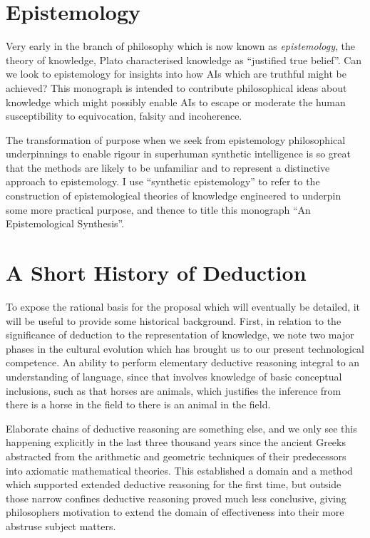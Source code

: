 \documentclass[10pt,titlepage]{book}
\begin{document}
\section{Epistemology}
  
Very early in the branch of philosophy which is now known as \emph{epistemology}, the theory of knowledge, Plato characterised knowledge as ``justified true belief''.
Can we look to epistemology for insights into how AIs which are truthful might be achieved?
This monograph is intended to contribute philosophical ideas about knowledge which might possibly enable AIs to escape or moderate the human susceptibility to equivocation, falsity and incoherence.

The transformation of purpose when we seek from epistemology philosophical underpinnings to enable rigour in superhuman synthetic intelligence is so great that the methods are likely to be unfamiliar and to represent a distinctive approach to epistemology.
I use ``synthetic epistemology'' to refer to the construction of epistemological theories of knowledge engineered to underpin some more practical purpose, and thence to title this monograph ``An Epistemological Synthesis''.

\section{A Short History of Deduction}

To expose the rational basis for the proposal which will eventually be detailed, it will be useful to provide some historical background.
First, in relation to the significance of deduction to the representation of knowledge, we note two major phases in the cultural evolution which has brought us to our present technological competence.
An ability to perform elementary deductive reasoning integral to an understanding of language, since that involves knowledge of basic conceptual inclusions, such as that horses are animals, which justifies the inference from there is a horse in the field to there is an animal in the field.

Elaborate chains of deductive reasoning are something else, and we only see this happening explicitly in the last three thousand years since the ancient Greeks abstracted from the arithmetic and geometric techniques of their predecessors into axiomatic mathematical theories.
This established a domain and a method which supported extended deductive reasoning for the first time, but outside those narrow confines deductive reasoning proved much less conclusive, giving philosophers motivation to extend the domain of effectiveness into their more abstruse subject matters.
\end{document}
